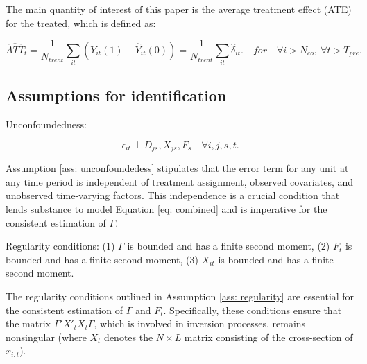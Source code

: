 \documentclass[12pt]{article}
\begin{document}
The main quantity of interest of this paper is the average treatment effect (ATE) for the treated, which is defined as:

\begin{equation}
\widehat{ATT}_{t} = \frac{1}{N_{treat}}\sum_{it} \left( Y_{it}(1) - \hat{Y}_{it}(0) \right) = \frac{1}{N_{treat}}\sum_{it}\hat{\delta}_{it}. \quad for \quad \forall i > N_{co}, \: \forall t > T_{pre}.
\end{equation}
\subsection{Assumptions for identification}

\begin{assumption}
Unconfoundedness:
\label{ass: unconfoundedess} 
\end{assumption}

\begin{equation}
\epsilon_{it} \perp D_{js}, X_{js}, F_s \quad \forall i, j, s, t.
\label{eq: unconfoundedess}
\end{equation}

Assumption \ref{ass: unconfoundedess} stipulates that the error term for any unit at any time period is independent of treatment assignment, observed covariates, and unobserved time-varying factors. This independence is a crucial condition that lends substance to model Equation \ref{eq: combined} and is imperative for the consistent estimation of $\Gamma$.

\begin{assumption}
Regularity conditions: (1) $\Gamma$ is bounded and has a finite second moment, (2) $F_t$ is bounded and has a finite second moment, (3) $X_{it}$ is bounded and has a finite second moment.
\label{ass: regularity}
\end{assumption}

The regularity conditions outlined in Assumption \ref{ass: regularity} are essential for the consistent estimation of $\Gamma$ and $F_{t}$. Specifically, these conditions ensure that the matrix $\Gamma'X'_tX_t\Gamma$, which is involved in inversion processes, remains nonsingular (where $X_t$ denotes the $N \times L$ matrix consisting of the cross-section of $x_{i,t}$).
\end{document}
